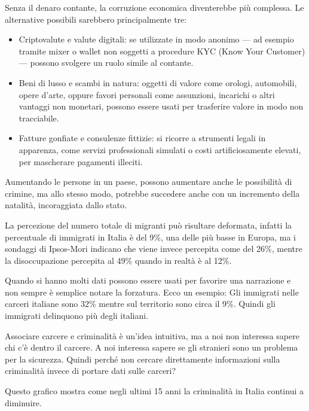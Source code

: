 \documentclass[12pt]{book} %
\begin{document}
\begin{mdframed}[linewidth=1pt]
Senza il denaro contante, la corruzione economica diventerebbe più complessa. Le alternative possibili sarebbero principalmente tre:

\begin{itemize}
\item Criptovalute e valute digitali: se utilizzate in modo anonimo — ad esempio tramite mixer o wallet non soggetti a procedure KYC (Know Your Customer) — possono svolgere un ruolo simile al contante.
\item Beni di lusso e scambi in natura: oggetti di valore come orologi, automobili, opere d’arte, oppure favori personali come assunzioni, incarichi o altri vantaggi non monetari, possono essere usati per trasferire valore in modo non tracciabile.
\item Fatture gonfiate e consulenze fittizie: si ricorre a strumenti legali in apparenza, come servizi professionali simulati o costi artificiosamente elevati, per mascherare pagamenti illeciti.
\end{itemize}
\end{mdframed}

Aumentando le persone in un paese, possono aumentare anche le possibilità di crimine, ma allo stesso modo, potrebbe succedere anche con un incremento della
natalità, incoraggiata dallo stato.

La percezione del numero totale di migranti può risultare deformata, infatti la percentuale di immigrati in Italia è del 9\%, una delle più basse in Europa, ma i sondaggi di Ipsos-Mori indicano che viene invece percepita come del 26\%, mentre la disoccupazione percepita al 49\% quando
in realtà è al 12\%.

Quando si hanno molti dati possono essere usati per favorire una narrazione e non sempre è semplice notare la forzatura.
Ecco un esempio: Gli immigrati nelle carceri italiane sono 32\% mentre sul territorio sono circa il 9\%. Quindi gli immigrati delinquono più degli italiani.

Associare carcere e criminalità è un'idea intuitiva, ma a noi non interessa sapere chi c'è dentro il carcere. A noi interessa sapere se gli stranieri sono un problema per la sicurezza. Quindi perché non cercare direttamente informazioni sulla criminalità invece di portare dati sulle carceri?

Questo grafico mostra come negli ultimi 15 anni la criminalità in Italia continui a diminuire.
\end{document}
